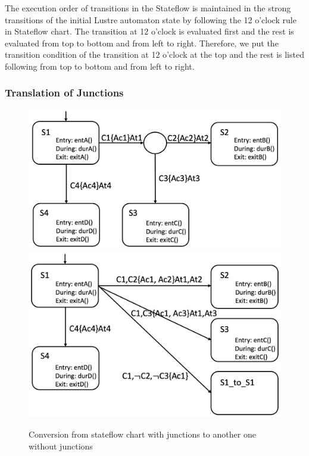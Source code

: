 \documentclass{article}
\begin{document}
The execution order of transitions in the Stateflow is maintained in the strong transitions of the initial Lustre automaton state by following the 12 o'clock rule in Stateflow chart.
The transition at 12 o'clock is evaluated first and the rest is evaluated from top to bottom and from left to right. 
Therefore, we put the transition condition of the transition at 12 o'clock at the top and the rest is listed following from top to bottom and from left to right. 

\subsubsection{Translation of Junctions}

\begin{figure}[h]
\begin{center}
  \includegraphics[scale=0.18]{figures/sf1} 
    \includegraphics[scale=0.15]{figures/sf2}    
\end{center}  
  \caption{Conversion from stateflow chart with junctions to another one without junctions}
  \label{sf1}
\end{figure}
\end{document}

